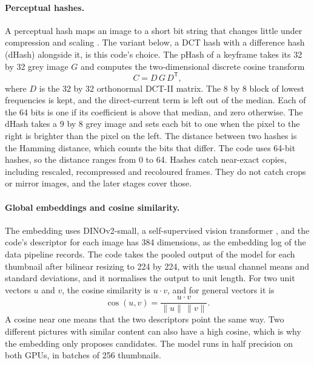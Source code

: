 \paragraph{Perceptual hashes.} A perceptual hash maps an image to a short bit string that changes little under compression and scaling \cite{venkatesan2000robust}. The variant below, a DCT hash with a difference hash (dHash) alongside it, is this code's choice. The pHash of a keyframe takes its 32 by 32 grey image $G$ and computes the two-dimensional discrete cosine transform
\begin{equation}
C=D\,G\,D^{\mathsf T},\label{eq:data-phash}
\end{equation}
where $D$ is the 32 by 32 orthonormal DCT-II matrix. The 8 by 8 block of lowest frequencies is kept, and the direct-current term is left out of the median. Each of the 64 bits is one if its coefficient is above that median, and zero otherwise. The dHash takes a 9 by 8 grey image and sets each bit to one when the pixel to the right is brighter than the pixel on the left. The distance between two hashes is the Hamming distance, which counts the bits that differ. The code uses 64-bit hashes, so the distance ranges from 0 to 64. Hashes catch near-exact copies, including rescaled, recompressed and recoloured frames. They do not catch crops or mirror images, and the later stages cover those.

\paragraph{Global embeddings and cosine similarity.} The embedding uses DINOv2-small, a self-supervised vision transformer \cite{oquab2024dinov2}, and the code's descriptor for each image has 384 dimensions, as the embedding log of the data pipeline records. The code takes the pooled output of the model for each thumbnail after bilinear resizing to 224 by 224, with the usual channel means and standard deviations, and it normalises the output to unit length. For two unit vectors $u$ and $v$, the cosine similarity is $u\cdot v$, and for general vectors it is
\begin{equation}
\cos(u,v)=\frac{u\cdot v}{\lVert u\rVert\,\lVert v\rVert}.\label{eq:data-cos}
\end{equation}
A cosine near one means that the two descriptors point the same way. Two different pictures with similar content can also have a high cosine, which is why the embedding only proposes candidates. The model runs in half precision on both GPUs, in batches of 256 thumbnails.

